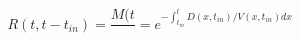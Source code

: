 \begin{equation}
R(t,t-t_{in}) = \frac{M(t}{} = e^{-\int_{t_{in}}^t D(x,t_{in})/V(x,t_{in}) dx}
\end{equation}